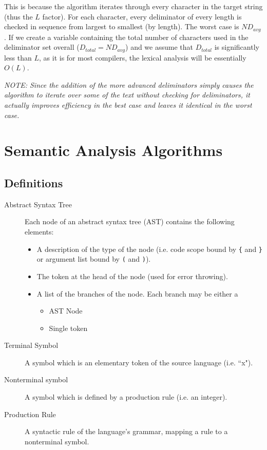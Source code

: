 \documentclass[10pt,a4paper]{article}
\begin{document}
This is because the algorithm iterates through every character in the target string (thus the $L$ factor). For each character, every deliminator of every length is checked in sequence from largest to smallest (by length). The worst case is $ND_{avg}$. If we create a variable containing the total number of characters used in the deliminator set overall ($D_{total} = ND_{avg}$) and we assume that $D_{total}$ is significantly less than $L$, as it is for most compilers, the lexical analysis will be essentially $O(L)$.

\textit{NOTE: Since the addition of the more advanced deliminators simply causes the algorithm to iterate over some of the text without checking for deliminators, it actually improves efficiency in the best case and leaves it identical in the worst case.}

\section{Semantic Analysis Algorithms}

\subsection{Definitions}
\begin{description}
\item[Abstract Syntax Tree] Each node of an abstract syntax tree (AST) contains the following elements:
	\begin{itemize}
	\item A description of the type of the node (i.e. code scope bound by \verb|{| and \verb|}| or argument list bound by \verb|(| and \verb|)|).
	\item The token at the head of the node (used for error throwing).
	\item A list of the branches of the node. Each branch may be either a
		\begin{itemize}
		\item AST Node
		\item Single token
		\end{itemize}
	\end{itemize}

\item[Terminal Symbol] A symbol which is an elementary token of the source language (i.e. ``x").

\item[Nonterminal symbol] A symbol which is defined by a production rule (i.e. an integer).

\item[Production Rule] A syntactic rule of the language's grammar, mapping a rule to a nonterminal symbol.
\end{description}
\end{document}
